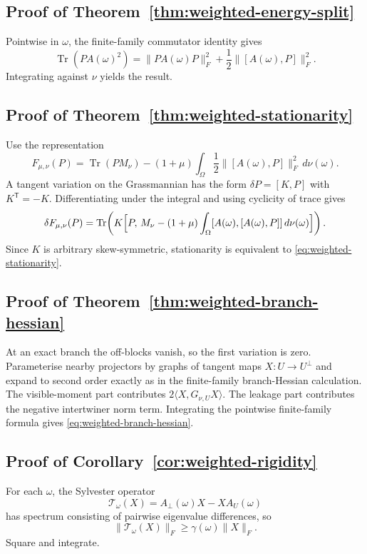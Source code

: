 \documentclass[11pt,a4paper]{article}
\numberwithin{equation}{section}
\DeclareMathOperator{\Tr}{Tr}
\theoremstyle{thmcompact}
\theoremstyle{remark}
\begin{document}
\subsection*{Proof of Theorem~\ref{thm:weighted-energy-split}}
Pointwise in $\omega$, the finite-family commutator identity gives
\begin{equation}
\Tr(PA(\omega)^2)=\|PA(\omega)P\|_F^2+\frac12\|[A(\omega),P]\|_F^2.
\end{equation}
Integrating against $\nu$ yields the result.

\subsection*{Proof of Theorem~\ref{thm:weighted-stationarity}}
Use the representation
\begin{equation}
F_{\mu,\nu}(P)=\Tr(PM_\nu)-(1+\mu)\int_\Omega \frac12\|[A(\omega),P]\|_F^2\,d\nu(\omega).
\end{equation}
A tangent variation on the Grassmannian has the form $\delta P=[K,P]$ with $K^{\mathsf T}=-K$. Differentiating under the integral and using cyclicity of trace gives
\begin{equation}
\delta F_{\mu,\nu}(P)
=\Tr\!\left(K\Bigl[P,\,M_\nu-(1+\mu)\int_\Omega [A(\omega),[A(\omega),P]]\,d\nu(\omega)\Bigr]\right).
\end{equation}
Since $K$ is arbitrary skew-symmetric, stationarity is equivalent to \eqref{eq:weighted-stationarity}.

\subsection*{Proof of Theorem~\ref{thm:weighted-branch-hessian}}
At an exact branch the off-blocks vanish, so the first variation is zero. Parameterise nearby projectors by graphs of tangent maps $X:U\to U^\perp$ and expand to second order exactly as in the finite-family branch-Hessian calculation. The visible-moment part contributes $2\langle X,G_{\nu,U}X\rangle$. The leakage part contributes the negative intertwiner norm term. Integrating the pointwise finite-family formula gives \eqref{eq:weighted-branch-hessian}.

\subsection*{Proof of Corollary~\ref{cor:weighted-rigidity}}
For each $\omega$, the Sylvester operator
\begin{equation}
\mathcal T_\omega(X)=A_\perp(\omega)X-XA_U(\omega)
\end{equation}
has spectrum consisting of pairwise eigenvalue differences, so
\begin{equation}
\|\mathcal T_\omega(X)\|_F\ge \gamma(\omega)\|X\|_F.
\end{equation}
Square and integrate.
\end{document}

